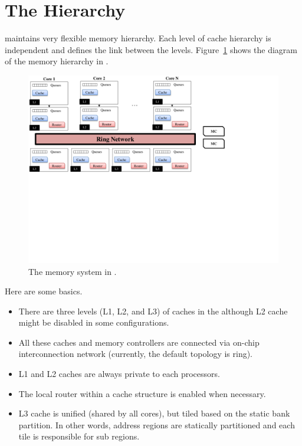 \section{The Hierarchy}
\label{sec:memhierarchy}

\SIM maintains very flexible memory hierarchy. Each level of cache 
hierarchy is independent and \SIM defines the link between the
levels. Figure~\ref{fig:memory} shows the diagram of the memory
hierarchy in \SIM.

\begin{figure}[htb]
\centering
\includegraphics[width=6.5in]{figs/memory}
\caption{The memory system in \SIM.}
\label{fig:memory}
\end{figure}



Here are some basics.


\begin{itemize}
  \item There are three levels (L1, L2, and L3) of caches in the \SIM
  although L2 cache might be disabled in some configurations.

  \item All these caches and memory controllers are connected via
  on-chip interconnection network (currently, the default topology is
  ring).

  \item L1 and L2 caches are always private to each processors.

  \item The local router within a cache structure is enabled when
  necessary.

  \item L3 cache is unified (shared by all cores), but tiled based on
  the static bank partition. In other words, address regions are
  statically partitioned and each tile is responsible for sub regions.

\end{itemize}



